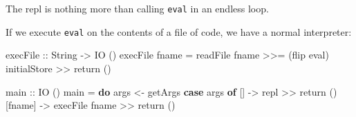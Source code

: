 \documentclass[]{article}
\newenvironment{Shaded}{}{}
\newcommand{\KeywordTok}[1]{\textcolor[rgb]{0.00,0.44,0.13}{\textbf{{#1}}}}
\newcommand{\DataTypeTok}[1]{\textcolor[rgb]{0.56,0.13,0.00}{{#1}}}
\newcommand{\StringTok}[1]{\textcolor[rgb]{0.25,0.44,0.63}{{#1}}}
\newcommand{\OtherTok}[1]{\textcolor[rgb]{0.00,0.44,0.13}{{#1}}}
\newcommand{\FunctionTok}[1]{\textcolor[rgb]{0.02,0.16,0.49}{{#1}}}
\newcommand{\NormalTok}[1]{{#1}}
\begin{document}
The repl is nothing more than calling \texttt{eval} in an endless loop.

\begin{Shaded}
\end{Shaded}

If we execute \texttt{eval} on the contents of a file of code, we have a
normal interpreter:

\begin{Shaded}
\begin{Highlighting}[]
\OtherTok{execFile ::} \DataTypeTok{String} \OtherTok{->} \DataTypeTok{IO} \NormalTok{()}
\NormalTok{execFile fname }\FunctionTok{=} \NormalTok{readFile fname }\FunctionTok{>>=} \NormalTok{(flip eval) initialStore }\FunctionTok{>>} \NormalTok{return ()}
\end{Highlighting}
\end{Shaded}

\begin{Shaded}
\begin{Highlighting}[]
\OtherTok{main ::} \DataTypeTok{IO} \NormalTok{()}
\NormalTok{main }\FunctionTok{=} \KeywordTok{do}
    \NormalTok{args }\OtherTok{<-} \NormalTok{getArgs}
    \KeywordTok{case} \NormalTok{args }\KeywordTok{of}
        \NormalTok{[]      }\OtherTok{->} \NormalTok{repl }\FunctionTok{>>} \NormalTok{return ()}
        \NormalTok{[fname] }\OtherTok{->} \NormalTok{execFile fname }\FunctionTok{>>} \NormalTok{return ()}
\end{Highlighting}
\end{Shaded}
\end{document}
